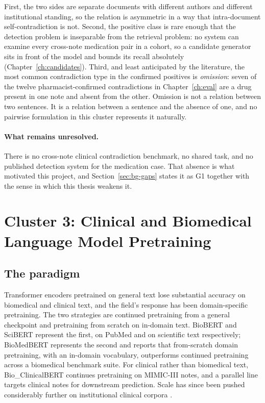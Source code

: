 First, the two sides are separate documents with different authors and different
institutional standing, so the relation is asymmetric in a way that intra-document
self-contradiction is not. Second, the positive class is rare enough that the
detection problem is inseparable from the retrieval problem: no system can
examine every cross-note medication pair in a cohort, so a candidate generator
sits in front of the model and bounds its recall absolutely
(Chapter~\ref{ch:candidates}). Third, and least anticipated by the literature,
the most common contradiction type in the confirmed positives is \emph{omission}:
seven of the twelve pharmacist-confirmed contradictions in
Chapter~\ref{ch:eval} are a drug present in one note and absent from the other.
Omission is not a relation between two sentences. It is a relation between a
sentence and the absence of one, and no pairwise formulation in this cluster
represents it naturally.

\paragraph{What remains unresolved.} There is no cross-note clinical
contradiction benchmark, no shared task, and no published detection system for
the medication case. That absence is what motivated this project, and
Section~\ref{sec:bg-gaps} states it as G1 together with the sense in which this
thesis weakens it.

\section{Cluster 3: Clinical and Biomedical Language Model Pretraining}
\label{sec:bg-pretraining}

\subsection{The paradigm}

Transformer encoders pretrained on general text \citep{devlin2019bert} lose
substantial accuracy on biomedical and clinical text, and the field's response
has been domain-specific pretraining. The two strategies are continued
pretraining from a general checkpoint and pretraining from scratch on in-domain
text. BioBERT \citep{lee2020biobert} and SciBERT \citep{beltagy2019scibert}
represent the first, on PubMed and on scientific text respectively;
BioMedBERT \citep{gu2021biomedbert} represents the second and reports that
from-scratch domain pretraining, with an in-domain vocabulary, outperforms
continued pretraining across a biomedical benchmark suite. For clinical rather
than biomedical text, Bio\_ClinicalBERT \citep{alsentzer2019clinicalbert}
continues pretraining on MIMIC-III notes, and a parallel line
\citep{huang2019clinicalbert} targets clinical notes for downstream prediction.
Scale has since been pushed considerably further on institutional clinical
corpora \citep{yang2022gatortron}.

